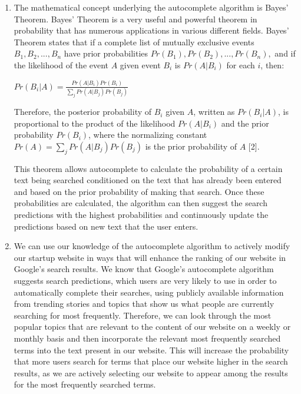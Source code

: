 \documentclass[12pt]{article}
\begin{document}
\begin{enumerate}
    \item The mathematical concept underlying the autocomplete algorithm is Bayes' Theorem. Bayes' Theorem is a very useful and powerful theorem in probability that has numerous applications in various different fields. Bayes' Theorem states that if a complete list of mutually exclusive events $B_1, B_2, ... , B_n$ have prior probabilities $Pr(B_1), Pr(B_2), ... , Pr(B_n),$ and if the likelihood of the event $A$ given event $B_i$ is $Pr(A|B_i)$ for each $i$, then:

    \begin{center}
    $Pr(B_i|A) = \frac{Pr(A|B_i)Pr(B_i)}{\sum\limits_jPr(A|B_j)Pr(B_j)}$
    \end{center}

    Therefore, the posterior probability of $B_i$ given $A$, written as $Pr(B_i|A)$, is proportional to the product of the likelihood $Pr(A|B_i)$ and the prior probability $Pr(B_i)$, where the normalizing constant $Pr(A) = \sum\limits_jPr(A|B_j)Pr(B_j)$ is the prior probability of $A$ [2].

    \qquad This theorem allows autocomplete to calculate the probability of a certain text being searched conditioned on the text that has already been entered and based on the prior probability of making that search. Once these probabilities are calculated, the algorithm can then suggest the search predictions with the highest probabilities and continuously update the predictions based on new text that the user enters.

    \item We can use our knowledge of the autocomplete algorithm to actively modify our startup website in ways that will enhance the ranking of our website in Google's search results. We know that Google's autocomplete algorithm suggests search predictions, which users are very likely to use in order to automatically complete their searches, using publicly available information from trending stories and topics that show us what people are currently searching for most frequently. Therefore, we can look through the most popular topics that are relevant to the content of our website on a weekly or monthly basis and then incorporate the relevant most frequently searched terms into the text present in our website. This will increase the probability that more users search for terms that place our website higher in the search results, as we are actively selecting our website to appear among the results for the most frequently searched terms.


\end{enumerate}
\end{document}
